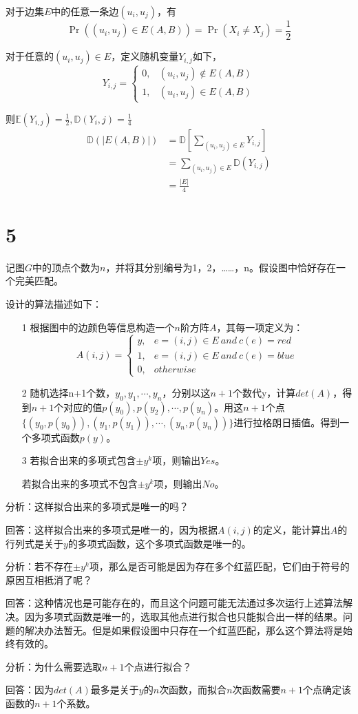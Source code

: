 \documentclass{article}
\begin{document}
对于边集$E$中的任意一条边$(u_i,u_j)$，有
$$\Pr((u_i,u_j)\in E(A,B))=\Pr(X_i\neq X_j)=\frac{1}{2}$$

对于任意的$(u_i,u_j)\in E$，定义随机变量$Y_{i,j}$如下，
\begin{equation*}
Y_{i,j}=
\begin{cases}
0, &(u_i,u_j) \notin E(A,B)\\
1, &(u_i,u_j) \in E(A,B)
\end{cases}
\end{equation*}

则$\mathbb{E}(Y_{i,j})=\frac{1}{2},\mathbb{D}(Y_i,j)=\frac{1}{4}$
\begin{align*}
\mathbb{D}(|E(A,B)|)&=\mathbb{D}[\sum_{(u_i,u_j)\in E}Y_{i,j}]\\
&=\sum_{(u_i,u_j)\in E} \mathbb{D}(Y_{i,j})\\
&=\frac{|E|}{4}
\end{align*}
\section*{5}
记图$G$中的顶点个数为$n$，并将其分别编号为1，2，……，n。假设图中恰好存在一个完美匹配。

设计的算法描述如下：
\begin{itemize}
\item[1]
根据图中的边颜色等信息构造一个$n$阶方阵$A$，其每一项定义为：
\begin{equation*}
A(i,j) = 
\begin{cases}
y, & e = (i,j) \in E\ and\ c(e)=red\\
1, & e = (i,j) \in E\ and\ c(e)=blue\\
0, & otherwise
\end{cases}
\end{equation*}

\item[2]
随机选择n+1个数，$y_0,y_1,\cdots,y_n$，分别以这$n+1$个数代y，计算$det(A)$，得到$n+1$个对应的值$p(y_0),p(y_2),\cdots,p(y_n)$。用这$n+1$个点$\{(y_0,p(y_0)),(y_1,p(y_1)),\cdots,(y_n,p(y_n))\}$进行拉格朗日插值。得到一个多项式函数$p(y)$。

\item[3]
若拟合出来的多项式包含$\pm y^k$项，则输出$Yes$。

若拟合出来的多项式不包含$\pm y^k$项，则输出$No$。
\end{itemize}

分析：这样拟合出来的多项式是唯一的吗？

回答：这样拟合出来的多项式是唯一的，因为根据$A(i,j)$的定义，能计算出$A$的行列式是关于$y$的多项式函数，这个多项式函数是唯一的。

分析：若不存在$\pm y^k$项，那么是否可能是因为存在多个红蓝匹配，它们由于符号的原因互相抵消了呢？

回答：这种情况也是可能存在的，而且这个问题可能无法通过多次运行上述算法解决。因为多项式函数是唯一的，选取其他点进行拟合也只能拟合出一样的结果。问题的解决办法暂无。但是如果假设图中只存在一个红蓝匹配，那么这个算法将是始终有效的。

分析：为什么需要选取$n+1$个点进行拟合？

回答：因为$det(A)$最多是关于$y$的$n$次函数，而拟合$n$次函数需要$n+1$个点确定该函数的$n+1$个系数。
\end{document}
